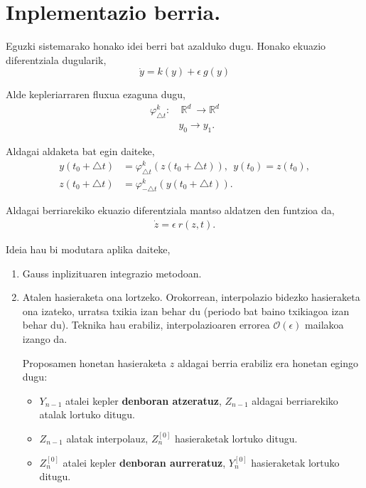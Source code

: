 \section{Inplementazio berria.}

Eguzki sistemarako honako idei berri bat azalduko dugu. Honako ekuazio diferentziala dugularik,
\begin{equation*}
\dot{y}=k(y)+\epsilon \ g(y)
\end{equation*}

Alde kepleriarraren fluxua ezaguna dugu,
\begin{align*}
\varphi_{\triangle t}^k:&  \ \mathbb{R}^d \ \longrightarrow \mathbb{R}^d  \\
&  y_0 \longrightarrow y_1. 
\end{align*}

Aldagai aldaketa bat egin daiteke,
\begin{align*}
y(t_0+\triangle t) &= \varphi _{\triangle t}^k(z(t_0+\triangle t)), \ \ y(t_0)=z(t_0), \\
z(t_0+\triangle t) &= \varphi _{-\triangle t}^k(y(t_0+\triangle t)).
\end{align*}

Aldagai berriarekiko ekuazio diferentziala mantso aldatzen den funtzioa da,
\begin{align*}
\dot{z}=\epsilon \ r(z,t).
\end{align*} 

Ideia hau bi modutara aplika daiteke,
\begin{enumerate}
\item Gauss inplizituaren integrazio metodoan.
\item Atalen hasieraketa ona lortzeko.
Orokorrean, interpolazio bidezko hasieraketa ona izateko,  urratsa txikia izan behar du (periodo bat baino txikiagoa izan behar du). Teknika hau erabiliz, interpolazioaren errorea $\mathcal{O}(\epsilon)$ mailakoa izango da.

Proposamen honetan hasieraketa $z$ aldagai berria erabiliz era honetan egingo dugu:
\begin{itemize}
\item $Y_{n-1}$ atalei kepler \textbf{denboran atzeratuz}, $Z_{n-1}$ aldagai berriarekiko atalak lortuko ditugu.
\item $Z_{n-1}$ alatak interpolauz, $Z_{n}^{[0]}$ hasieraketak lortuko ditugu.
\item $Z_{n}^{[0]}$ atalei kepler \textbf{denboran aurreratuz}, $Y_{n}^{[0]}$ hasieraketak lortuko ditugu.
\end{itemize}


\end{enumerate}



